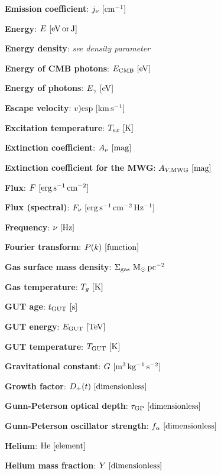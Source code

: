 \documentclass[a4paper,11pt]{article}
\begin{document}
{\noindent}\textbf{Emission coefficient}: $j_\nu ~ [{\rm cm^{-1}}]$

{\noindent}\textbf{Energy}: $E ~ [{\rm eV\,or\,J}]$

{\noindent}\textbf{Energy density}: \textit{see density parameter}

{\noindent}\textbf{Energy of CMB photons}: $E_\mathrm{CMB} ~ [{\rm eV}]$

{\noindent}\textbf{Energy of photons}: $E_\gamma ~ [{\rm eV}]$

{\noindent}\textbf{Escape velocity}: $v)\mathrm{esp} ~ [{\rm km\,s^{-1}}]$

{\noindent}\textbf{Excitation temperature}: $T_{ex} ~ [{\rm K}]$

{\noindent}\textbf{Extinction coefficient}: $A_\nu ~ [{\rm mag}]$

{\noindent}\textbf{Extinction coefficient for the MWG}: $A_{V,\mathrm{MWG}} ~ [{\rm mag}]$

{\noindent}\textbf{Flux}: $F ~ [{\rm erg\,s^{-1}\,cm^{-2}}]$

{\noindent}\textbf{Flux (spectral)}: $F_\nu ~ [{\rm erg\,s^{-1}\,cm^{-2}\,Hz^{-1}}]$

{\noindent}\textbf{Frequency}: $\nu ~ [{\rm Hz}]$

{\noindent}\textbf{Fourier transform}: $P(k) ~ [{\rm function}]$

{\noindent}\textbf{Gas surface mass density}: $\Sigma_\mathrm{gas} ~ {\rm M_\odot\,pc^{-2}}$

{\noindent}\textbf{Gas temperature}: $T_g ~ [{\rm K}]$

{\noindent}\textbf{GUT age}: $t_\mathrm{GUT} ~ [{\rm s}]$

{\noindent}\textbf{GUT energy}: $E_\mathrm{GUT} ~ [{\rm TeV}]$

{\noindent}\textbf{GUT temperature}: $T_\mathrm{GUT} ~ [{\rm K}]$

{\noindent}\textbf{Gravitational constant}: $G ~ [{\rm m^3\,kg^{-1}\,s^{-2}}]$

{\noindent}\textbf{Growth factor}: $D_+(t) ~ [{\rm dimensionless}]$

{\noindent}\textbf{Gunn-Peterson optical depth}: $\tau_\mathrm{GP} ~ [{\rm dimensionless}]$

{\noindent}\textbf{Gunn-Peterson oscillator strength}: $f_\alpha ~ [{\rm dimensionless}]$

{\noindent}\textbf{Helium}: ${\rm He} ~ [{\rm element}]$

{\noindent}\textbf{Helium mass fraction}: $Y ~ [{\rm dimensionless}]$
\end{document}
